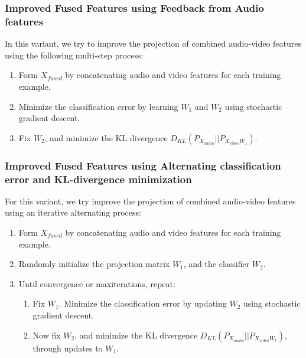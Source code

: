 \documentclass{article}
\begin{document}
\subsubsection{Improved Fused Features using Feedback from Audio features} \label{variant2}
    In this variant, we try to improve the projection of combined audio-video features using the following multi-step process:

      \begin{enumerate}
        \item Form $X_{fused}$ by concatenating audio and video features for each training example.
        \item Minimize the classification error by learning $W_1$ and $W_2$ using stochastic gradient descent.
        \item Fix $W_2$, and minimize the KL divergence $D_{KL} (P_{X_{audio}} || P_{X_{video} W_1})$.
      \end{enumerate} 
      
\subsubsection{Improved Fused Features using Alternating classification error and KL-divergence minimization} \label{variant3}
    For this variant, we try improve the projection of combined audio-video features using an iterative alternating process:

      \begin{enumerate}
        \item Form $X_{fused}$ by concatenating audio and video features for each training example.
        \item Randomly initialize the projection matrix $W_1$, and the classifier $W_2$.
        \item Until convergence or max\-iterations, repeat:
        \begin{enumerate}
          \item Fix $W_1$. Minimize the classification error by updating $W_2$ using stochastic gradient descent.
          \item Now fix $W_2$, and minimize the KL divergence $D_{KL} (P_{X_{audio}} || P_{X_{video} W_1})$, through updates to $W_1$.
        \end{enumerate}  
      \end{enumerate} 
  
\end{document}
